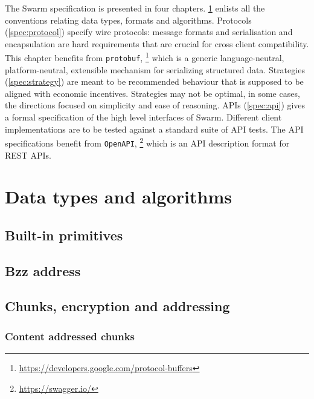 
The Swarm specification is presented in four chapters. \ref{spec:convention} enlists all the conventions relating data types, formats and algorithms. Protocols 
(\ref{spec:protocol}) specify wire protocols: message formats and serialisation and encapsulation are hard requirements that are crucial for  cross client compatibility. This chapter benefits from \lstinline{protobuf},%
%
\footnote{\url{https://developers.google.com/protocol-buffers}}
%
which is a generic language-neutral, platform-neutral, extensible mechanism for serializing structured data.
Strategies (\ref{spec:strategy}) are meant to be recommended  behaviour that is supposed to be aligned with economic incentives.
Strategies may not be optimal, in some cases, the directions focused on simplicity and ease of reasoning.
APIs (\ref{spec:api}) gives a formal specification of the high level interfaces of Swarm. Different client implementations are  to be tested against a standard suite of API tests. The API specifications benefit from \lstinline{OpenAPI},%
%
\footnote{\url{https://swagger.io/}}
%
which is an API description format for REST APIs.


\listoftheorems[ignoreall,show={definition}]

\chapter{Data types and algorithms}\label{spec:convention}

\orange{}

\section{Built-in primitives \statusyellow}\label{spec:format:builtin}


\section{Bzz address}\label{spec:format:bzzaddress}


\section{Chunks, encryption and addressing}
\subsection{Content addressed chunks \statusyellow}\label{spec:format:chunks}

